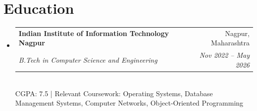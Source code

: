 \documentclass[letterpaper,10pt]{article}
\makeatletter
\newenvironment{resumeList}{
  \begin{itemize}[leftmargin=0.15in, label={}]
}{
  \end{itemize}
}
\newcommand{\resumeSubheading}[4]{
  \vspace{-2pt}\item
    \begin{tabular*}{0.97\textwidth}[t]{l@{\extracolsep{\fill}}r}
      \textbf{#1} & #2 \\
      \textit{\small#3} & \textit{\small #4} \\
    \end{tabular*}\vspace{-6pt}
}
\makeatother
\begin{document}
\section{Education}
\begin{resumeList}
    \resumeSubheading
    {Indian Institute of Information Technology Nagpur}{Nagpur, Maharashtra}
    {B.Tech in Computer Science and Engineering}{Nov 2022 – May 2026}
    \vspace{2pt}\\
    \small{CGPA: 7.5 | Relevant Coursework: Operating Systems, Database Management Systems, Computer Networks, Object-Oriented Programming}
\end{resumeList}
\end{document}
